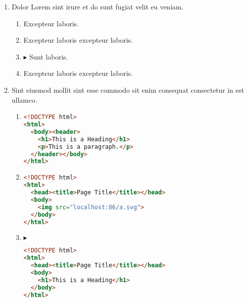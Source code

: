 \documentclass[a4paper,12pt]{article}
\begin{document}
\begin{enumerate}[label=\textbf{\arabic*.}]
\begin{multicols}{2}
\begin{enumerate}
		\item  Excepteur laboris.
    
		\item  Excepteur laboris excepteur laboris.
    
		\item  Excepteur laboris excepteur laboris.
  
	\end{enumerate}

\end{multicols}
\item Dolor Lorem sint irure et do sunt fugiat velit eu veniam.
\begin{multicols}{2}
	\begin{enumerate}
		\item  Excepteur laboris.
    
		\item  Excepteur laboris excepteur laboris.
  
		\item $\blacktriangleright$  Sunt laboris.
    
		\item  Excepteur laboris excepteur laboris.
    
	\end{enumerate}

\end{multicols}
\item Sint eiusmod mollit sint esse commodo sit enim consequat consectetur in est ullamco.
	\begin{enumerate}
		\item  \hfill \vspace*{-7mm}
    \begin{lstlisting}[language=HTML]
<!DOCTYPE html> 
<html>
  <body><header>
    <h1>This is a Heading</h1>
    <p>This is a paragraph.</p>
  </header></body>
</html>
    \end{lstlisting}
    
		\item  \hfill \vspace*{-7mm}
    \begin{lstlisting}[language=HTML]
<!DOCTYPE html>
<html>
  <head><title>Page Title</title></head>
  <body>
    <img src="localhost:86/a.svg">
  </body>
</html>
    \end{lstlisting}
    
		\item $\blacktriangleright$  \hfill \vspace*{-7mm}
    \begin{lstlisting}[language=HTML]
<!DOCTYPE html>
<html>
  <head><title>Page Title</title></head>
  <body>
    <h1>This is a Heading</h1>
  </body>
</html>
    \end{lstlisting}
    

\end{enumerate}
\end{enumerate}
\end{document}
